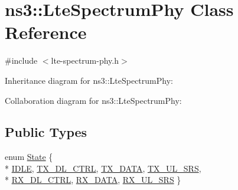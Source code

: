 \hypertarget{classns3_1_1LteSpectrumPhy}{}\section{ns3\+:\+:Lte\+Spectrum\+Phy Class Reference}
\label{classns3_1_1LteSpectrumPhy}


{\ttfamily \#include $<$lte-\/spectrum-\/phy.\+h$>$}



Inheritance diagram for ns3\+:\+:Lte\+Spectrum\+Phy\+:


Collaboration diagram for ns3\+:\+:Lte\+Spectrum\+Phy\+:
\subsection*{Public Types}
\begin{DoxyCompactItemize}
\item 
enum \hyperlink{classns3_1_1LteSpectrumPhy_a52ce2cf9b4846807449c50399f6b8000}{State} \{ \\*
\hyperlink{classns3_1_1LteSpectrumPhy_a52ce2cf9b4846807449c50399f6b8000a2e09524021e98183b06be8afd923a4c2}{I\+D\+LE}, 
\hyperlink{classns3_1_1LteSpectrumPhy_a52ce2cf9b4846807449c50399f6b8000a901bd52b34b4ada4dd781d65c0061fe9}{T\+X\+\_\+\+D\+L\+\_\+\+C\+T\+RL}, 
\hyperlink{classns3_1_1LteSpectrumPhy_a52ce2cf9b4846807449c50399f6b8000af3e5ba50183ad64a91804f43f1f226c3}{T\+X\+\_\+\+D\+A\+TA}, 
\hyperlink{classns3_1_1LteSpectrumPhy_a52ce2cf9b4846807449c50399f6b8000ac5787701c401b89263d16c318892f1c0}{T\+X\+\_\+\+U\+L\+\_\+\+S\+RS}, 
\\*
\hyperlink{classns3_1_1LteSpectrumPhy_a52ce2cf9b4846807449c50399f6b8000ac85f9c84ab77d31b1aba0b7d8ca4482b}{R\+X\+\_\+\+D\+L\+\_\+\+C\+T\+RL}, 
\hyperlink{classns3_1_1LteSpectrumPhy_a52ce2cf9b4846807449c50399f6b8000a3d8b0f938acc5e61bf26a23b56ecbfaa}{R\+X\+\_\+\+D\+A\+TA}, 
\hyperlink{classns3_1_1LteSpectrumPhy_a52ce2cf9b4846807449c50399f6b8000aafc3f752bdb8472fa1a379757ce8a09f}{R\+X\+\_\+\+U\+L\+\_\+\+S\+RS}
 \}
\end{DoxyCompactItemize}
